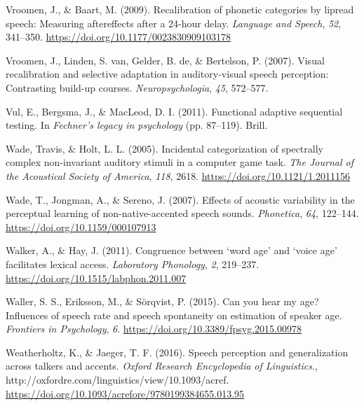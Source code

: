 \documentclass[
  11pt,
  english,
  man,floatsintext]{apa6}
\newlength{\cslhangindent}
\newlength{\cslentryspacingunit} %
\newenvironment{CSLReferences}[2] %
 {%
  \setlength{\parindent}{0pt}
  \ifodd #1
  \let\oldpar\par
  \def\par{\hangindent=\cslhangindent\oldpar}
  \fi
  \setlength{\parskip}{#2\cslentryspacingunit}
 }%
 {}
\begin{document}
\begin{CSLReferences}{1}{0}
\leavevmode{}%
Vroomen, J., \& Baart, M. (2009). Recalibration of phonetic categories by lipread speech: Measuring aftereffects after a 24-hour delay. \emph{Language and Speech}, \emph{52}, 341--350. \url{https://doi.org/10.1177/0023830909103178}

\leavevmode{}%
Vroomen, J., Linden, S. van, Gelder, B. de, \& Bertelson, P. (2007). Visual recalibration and selective adaptation in auditory-visual speech perception: Contrasting build-up courses. \emph{Neuropsychologia}, \emph{45}, 572--577.

\leavevmode{}%
Vul, E., Bergsma, J., \& MacLeod, D. I. (2011). Functional adaptive sequential testing. In \emph{Fechner's legacy in psychology} (pp. 87--119). Brill.

\leavevmode{}%
Wade, Travis, \& Holt, L. L. (2005). Incidental categorization of spectrally complex non-invariant auditory stimuli in a computer game task. \emph{The Journal of the Acoustical Society of America}, \emph{118}, 2618. \url{https://doi.org/10.1121/1.2011156}

\leavevmode{}%
Wade, T., Jongman, A., \& Sereno, J. (2007). Effects of acoustic variability in the perceptual learning of non-native-accented speech sounds. \emph{Phonetica}, \emph{64}, 122--144. \url{https://doi.org/10.1159/000107913}

\leavevmode{}%
Walker, A., \& Hay, J. (2011). Congruence between {`word age'} and {`voice age'} facilitates lexical access. \emph{Laboratory Phonology}, \emph{2}, 219--237. \url{https://doi.org/10.1515/labphon.2011.007}

\leavevmode{}%
Waller, S. S., Eriksson, M., \& Sörqvist, P. (2015). Can you hear my age? Influences of speech rate and speech spontaneity on estimation of speaker age. \emph{Frontiers in Psychology}, \emph{6}. \url{https://doi.org/10.3389/fpsyg.2015.00978}

\leavevmode{}%
Weatherholtz, K., \& Jaeger, T. F. (2016). Speech perception and generalization across talkers and accents. \emph{Oxford Research Encyclopedia of Linguistics.}, http://oxfordre.com/linguistics/view/10.1093/acref. \url{https://doi.org/10.1093/acrefore/9780199384655.013.95}


\end{CSLReferences}
\end{document}
